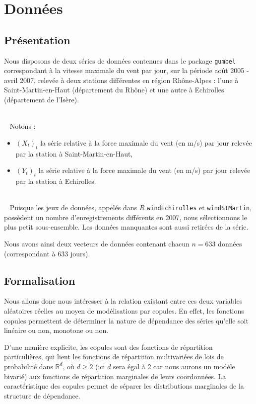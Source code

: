
\section{Données}
\subsection{Présentation}

Nous disposons de deux séries de données contenues dans le package \lstinline!gumbel! correspondant à la vitesse maximale du vent par jour, sur la période août 2005 - avril 2007,
relevée à deux stations différentes en région Rhône-Alpes : l'une à Saint-Martin-en-Haut (département du Rhône) et une autre à Echirolles (département de l'Isère).

~\\~
Notons :
\begin{itemize}
\item $(X_t)_t$ la série relative à la force maximale du vent (en m/s) par jour relevée par la station à Saint-Martin-en-Haut, 
\item $(Y_t)_t$ la série relative à la force maximale du vent (en m/s) par jour relevée par la station à Echirolles.
\end{itemize}

~\\~
Puisque les jeux de données, appelés dans $R$ \lstinline!windEchirolles! et \lstinline!windStMartin!, possèdent 
un nombre d’enregistrements différents en 2007, nous sélectionnons le plus petit sous-ensemble. Les données manquantes sont aussi retirées de la série.

Nous avons ainsi deux vecteurs de données contenant chacun $n=633$ données (correspondant à 633 jours).


\subsection{Formalisation}

Nous allons donc nous intéresser à la relation existant entre ces deux variables aléatoires réelles au moyen de modélisations par copules.
En effet,  les fonctions copules permettent de déterminer la nature de dépendance des séries qu’elle soit linéaire ou non, monotone ou non.

D'une manière explicite, les copules sont des fonctions de répartition particulières,
qui lient les fonctions de répartition multivariées de lois de probabilité dans $\mathbb{R}^d$, où $d \geq 2$ (ici $d$ sera égal à 2 car nous aurons un modèle bivarié) aux fonctions de répartition marginales de leurs coordonnées. 
La caractéristique des copules permet de séparer les distributions marginales de la structure de dépendance.

